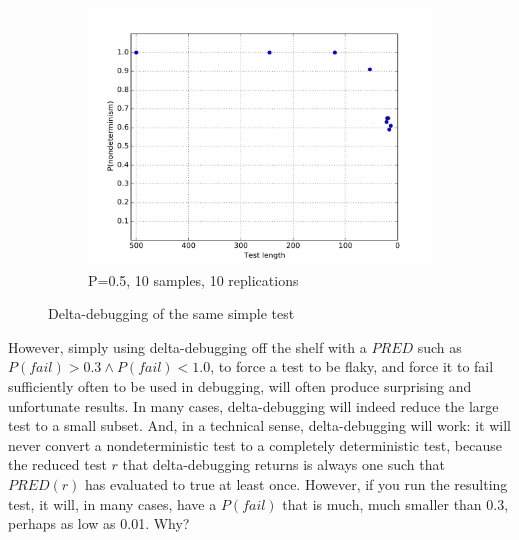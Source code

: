 \begin{figure}
\begin{subfigure}{0.30\columnwidth}
\label{fig:p2}
\end{subfigure}
\begin{subfigure}{0.30\columnwidth}
\centering
\includegraphics[width=\columnwidth]{lengthddminforceprep}
\caption{P=0.5, 10 samples, 10 replications}
\label{fig:p3}
\end{subfigure}
\caption{Delta-debugging of the same simple test}
\end{figure}

However, simply using delta-debugging off the shelf with a $\mathit{PRED}$
such as $P(fail) > 0.3 \wedge P(fail) < 1.0$, to force a test to be flaky, and force it to fail
sufficiently often to be used in debugging, will often produce
surprising and unfortunate results.  In many cases,
delta-debugging will indeed reduce the large test to a small subset.
And, in a technical sense, delta-debugging will work:  it will never
convert a nondeterministic test to a completely deterministic test,
because the reduced test $r$ that delta-debugging returns is always one
such that $\mathit{PRED}(r)$ has evaluated to true at least once.
However, if you run the resulting test, it will, in many cases, have a
$P(fail)$ that is much, much smaller than
0.3, perhaps as low as 0.01.  Why?

